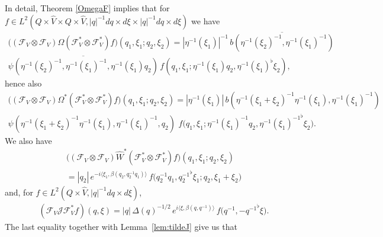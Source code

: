 \documentclass[a4paper,11pt,reqno]{amsart}
\numberwithin{equation}{section}
\theoremstyle{remark}
\theoremstyle{definition}
\newcommand{\CJ}{\mathcal J}
\newcommand{\CF}{\mathcal F}
\begin{document}
In detail,  Theorem \ref{OmegaF} implies that for $f\in L^2(Q\times\hat V\times Q\times\hat V,|q|^{-1}dq\times d\xi\times |q|^{-1}dq\times d\xi)$ we have
\begin{multline*}
\big((\CF_V\otimes\CF_V)\Omega (\CF_V^*\otimes\CF_V^*)f\big)(q_1,\xi_1;q_2,\xi_2)=
 |\eta^{-1}(\xi_1)|^{-1}\,\overline {b(\eta^{-1}(\xi_2)^{-1},\eta^{-1}(\xi_1)^{-1})}\\
\overline{\psi(\eta^{-1}(\xi_2)^{-1},\eta^{-1}(\xi_1)^{-1},\eta^{-1}(\xi_1)q_2)}\,f(q_1, \xi_1 ;\eta^{-1}(\xi_1)q_2,\eta^{-1}(\xi_1)^\flat\xi_2),
\end{multline*}
hence also
\begin{multline*}
\big((\CF_V\otimes\CF_V)\Omega^* (\CF_V^*\otimes\CF_V^*)f\big)(q_1,\xi_1;q_2,\xi_2)=|\eta^{-1}(\xi_1)|\,
 b(\eta^{-1}(\xi_1+\xi_2)^{-1}\eta^{-1}(\xi_1),\eta^{-1}(\xi_1)^{-1})\\
\psi(\eta^{-1}(\xi_1+\xi_2)^{-1}\eta^{-1}(\xi_1),\eta^{-1}(\xi_1)^{-1},q_2)\, \,f\big(q_1, \xi_1 ;\eta^{-1}(\xi_1)^{-1}q_2,{\eta^{-1}(\xi_1)^{-1}}^\flat\xi_2\big).
\end{multline*}
 We also have
\begin{multline*}
\big((\CF_V\otimes \CF_V)\hat W^* (\CF_V^*\otimes \CF_V^*)f\big)(q_1,\xi_1;q_2,\xi_2)\\
= |q_2|\, e^{-i\langle\xi_1,\beta(q_2,q_2^{-1}q_1)\rangle}\,f\big(q_2^{-1}q_1,{q_2^{-1}}^\flat\xi_1;q_2,\xi_1+\xi_2\big)
\end{multline*}
and, for $f\in L^2(Q\times\hat V,|q|^{-1}dq\times d\xi)$,
\begin{align*}
(\CF_V \CJ\CF_V^*f)(q,\xi)=|q|\,\Delta(q)^{-1/2}\,e^{i\langle \xi,\beta(q,q^{-1})\rangle}\,f\big(q^{-1},-{q^{-1}}^\flat\xi\big).
\end{align*}
The last equality together with Lemma~\ref{lem:tildeJ} give us that
\end{document}
